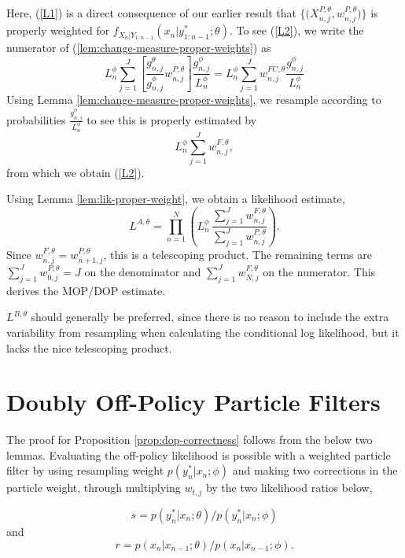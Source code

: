 \documentclass{article}
\begin{document}
Here, (\ref{L1}) is a direct consequence of our earlier result that $\{ \big(X^{P,\theta}_{n,j},w^{P,\theta}_{n,j}\big) \}$ is properly weighted for $f_{X_{n}|Y_{1:n-1}}(x_{n}|y^*_{1:n-1};\theta)$.
To see  (\ref{L2}),
we write the numerator of (\ref{lem:change-measure-proper-weights}) as
\[
L^\phi_n \sum_{j=1}^J \left[ \frac{g^\theta_{n,j}}{g^\phi_{n,j}} w^{P,\theta}_{n,j}\right] \frac{g^\phi_{n,j}}{L_n^\phi}
= L^\phi_n \sum_{j=1}^J w_{n,j}^{FC,\theta} \frac{g^\phi_{n,j}}{L_n^\phi}
\]
Using Lemma \ref{lem:change-measure-proper-weights}, we resample according to probabilities $\frac{g^\phi_{n,j}}{L_n^\phi}$ to see this is properly estimated by
\[
L^\phi_n \sum_{j=1}^J w^{F,\theta}_{n,j},
\]
from which we obtain (\ref{L2}).

Using Lemma \ref{lem:lik-proper-weight}, we obtain a likelihood estimate,
\[
L^{A,\theta} = \prod_{n=1}^N \left( L^\phi_n \, \frac{\sum_{j=1}^J w^{F,\theta}_{n,j}}{\sum_{j=1}^J w^{P,\theta}_{n,j}}\right).
\]
Since $w^{F,\theta}_{n,j}=w^{P,\theta}_{n+1,j}$, this is a telescoping product. The remaining terms are
$\sum_{j=1}^J w^{P,\theta}_{0,j} = J$ on the denominator and $\sum_{j=1}^J w^{F,\theta}_{N,j}$ on the numerator.
This derives the MOP/DOP estimate.

$L^{B,\theta}$ should generally be preferred, since there is no reason to include the extra variability from resampling when calculating the conditional log likelihood, but it lacks the nice telescoping product.



\section{Doubly Off-Policy Particle Filters}
\label{app:dop}


The proof for Proposition \ref{prop:dop-correctness} follows from the below two lemmas. Evaluating the off-policy likelihood is possible with a weighted particle filter by using resampling weight $p(y^*_n|x_n;\phi)$ and making two corrections in the particle weight, through multiplying $w_{t,j}$ by the two likelihood ratios below,

\begin{equation}
    \label{eq:dmeas-ratio}
    s=p(y^*_n|x_n;\theta)/p(y^*_n|x_n;\phi)
\end{equation}
and
\begin{equation}
    \label{eq:rproc-ratio}
    r=p(x_n|x_{n-1};\theta)/p(x_n|x_{n-1};\phi).
\end{equation}
\end{document}
